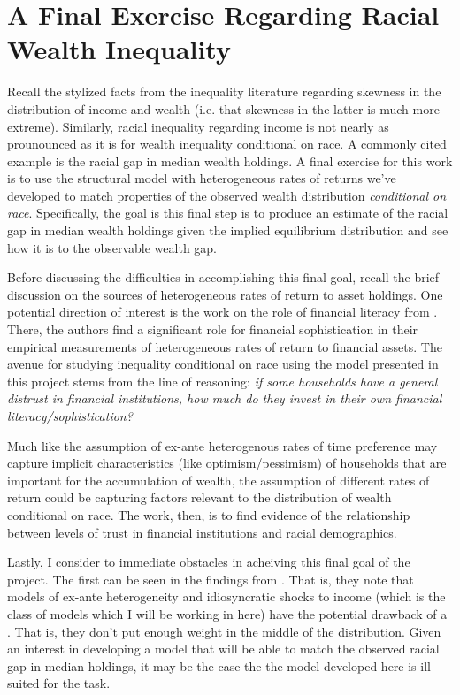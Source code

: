 \documentclass[\econtexRoot/Preproposal]{subfiles}
\begin{document}
\onlyinsubfile{\setcounter{section}{4}}
\section{A Final Exercise Regarding Racial Wealth Inequality}

\par Recall the stylized facts from the inequality literature regarding skewness in the distribution of income and wealth (i.e. that skewness in the latter is much more extreme). Similarly, racial inequality regarding income is not nearly as prounounced as it is for wealth inequality conditional on race. A commonly cited example is the racial gap in median wealth holdings. A final exercise for this work is to use the structural model with heterogeneous rates of returns we've developed to match properties of the observed wealth distribution \textit{conditional on race}. Specifically, the goal is this final step is to produce an estimate of the racial gap in median wealth holdings given the implied equilibrium distribution and see how  it is to the observable wealth gap.

\par Before discussing the difficulties in accomplishing this final goal, recall the brief discussion on the sources of heterogeneous rates of return to asset holdings. One potential direction of interest is the work on the role of financial literacy from \cite{fddgri14}. There, the authors find a significant role for financial sophistication in their empirical measurements of heterogeneous rates of return to financial assets. The avenue for studying inequality conditional on race using the model presented in this project stems from the line of reasoning: \textit{if some households have a general distrust in financial institutions, how much do they invest in their own financial literacy/sophistication?}

\par Much like the assumption of ex-ante heterogenous rates of time preference may capture implicit characteristics (like optimism/pessimism) of households that are important for the accumulation of wealth, the assumption of different rates of return could be capturing factors relevant to the distribution of wealth conditional on race. The work, then, is to find evidence of the relationship between levels of trust in financial institutions and racial demographics.

\par Lastly, I consider to immediate obstacles in acheiving this final goal of the project. The first can be seen in the findings from \cite{gkgv22}. That is, they note that models of ex-ante heterogeneity and idiosyncratic shocks to income (which is the class of models which I will be working in here) have the potential drawback of a . That is, they don't put enough weight in the middle of the distribution. Given  an interest in developing a model that will be able to match the observed racial gap in median holdings, it may be the case the the model developed here is ill-suited for the task.
\end{document}
